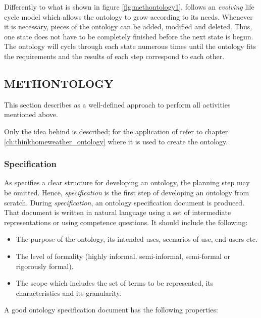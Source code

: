Differently to what is shown in figure \ref{fig:methontology1}, \methontology follows an \emph{evolving} life cycle model which allows the ontology to grow according to its needs. Whenever it is necessary, pieces of the ontology can be added, modified and deleted. Thus, one state does not have to be completely finished before the next state is begun. The ontology will cycle through each state numerous times until the ontology fits the requirements and the results of each step correspond to each other.

\subsection{METHONTOLOGY}
\label{sec:methontology}

This section describes \methontology as a well-defined approach to perform all activities mentioned above.

Only the idea behind \methontology is described; for the application of \methontology refer to chapter \ref{ch:thinkhomeweather_ontology} where it is used to create the \thinkhomeweather ontology.

\subsubsection{Specification}

As \methontology specifies a clear structure for developing an ontology, the planning step may be omitted. Hence, \emph{specification} is the first step of developing an ontology from scratch. During \emph{specification}, an ontology specification document is produced. That document is written in natural language using a set of intermediate representations or using competence questions. It should include the following:

\begin{itemize}
  \item The purpose of the ontology, its intended uses, scenarios of use, end-users etc.
  \item The level of formality (highly informal, semi-informal, semi-formal or rigorously formal). %
  \item The scope which includes the set of terms to be represented, its characteristics and its granularity.
\end{itemize}

A good ontology specification document has the following properties:

